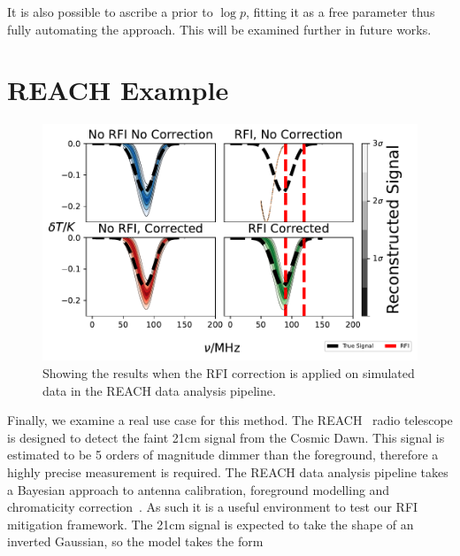 \documentclass[fleqn,usenatbib]{mnras}
\begin{document}
It is also possible to ascribe a prior to $\log p$, fitting it as a free parameter thus fully automating the approach. This will be examined further in future works.
\vfill
\section{REACH Example}\label{sec:reachex}
\begin{figure}
	\includegraphics[width=\textwidth]{f_4pane_reach_sidebar.pdf}
    \caption{Showing the results when the RFI correction is applied on simulated data in the REACH data analysis pipeline.}\label{fig:reach_dual_plot}
\end{figure}
Finally, we examine a real use case for this method. The REACH~\cite{de2022reach} radio telescope is designed to detect the faint 21cm signal from the Cosmic Dawn. This signal is estimated to be 5 orders of magnitude dimmer than the foreground, therefore a highly precise measurement is required. The REACH data analysis pipeline takes a Bayesian approach to antenna calibration, foreground modelling and chromaticity correction~\cite{anstey2021general}. As such it is a useful environment to test our RFI mitigation framework. The 21cm signal is expected to take the shape of an inverted Gaussian, so the model takes the form
\end{document}
